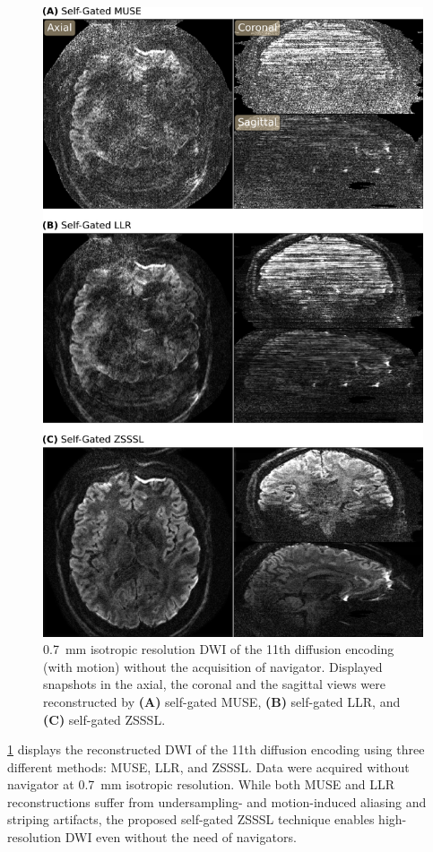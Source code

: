 \documentclass[journal,twoside,web]{ieeecolor}
\begin{document}
	\begin{figure}
		\centering
		\includegraphics[width=\columnwidth]{../figures/fig5.png}
		\caption{\SI{0.7}{\milli\meter} isotropic resolution DWI
			of the 11th diffusion encoding (with motion)
			without the acquisition of navigator.
			Displayed snapshots in the axial, the coronal and the sagittal views
			were reconstructed by \textbf{(A)} self-gated MUSE,
			\textbf{(B)} self-gated LLR, and
			\textbf{(C)} self-gated ZSSSL.}
		\label{FIG:MOTION_PROS}
	\end{figure}

	\cref{FIG:MOTION_PROS} displays the reconstructed DWI of the 11th diffusion encoding
	using three different methods: MUSE, LLR, and ZSSSL.
	Data were acquired without navigator at \SI{0.7}{\milli\meter} isotropic resolution.
	While both MUSE and LLR reconstructions suffer from
	undersampling- and motion-induced aliasing and striping artifacts,
	the proposed self-gated ZSSSL technique enables high-resolution DWI even
	without the need of navigators.
\end{document}
